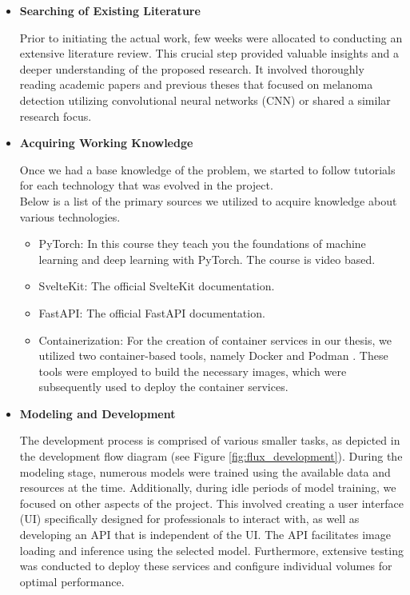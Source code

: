 \begin{itemize}
  \item{\textbf{Searching of Existing Literature}}

    Prior to initiating the actual work, few weeks were allocated
    to conducting an extensive literature review. This crucial step provided
    valuable insights and a deeper understanding of the proposed research. It
    involved thoroughly reading academic papers and previous theses that
    focused on melanoma detection utilizing convolutional neural networks (CNN)
    or shared a similar research focus.

  \item{\textbf{Acquiring Working Knowledge}}

    Once we had a base knowledge of the problem, we started to follow tutorials
    for each technology that was evolved in the project. \\

    Below is a list of the primary sources we utilized to acquire knowledge
    about various technologies.

    \begin{itemize}

      \item PyTorch: \cite{LearnPyTorch} In this course they teach you the
        foundations of machine learning and deep learning with PyTorch. The
        course is video based.

      \item SvelteKit: \cite{LearnSvelteKit} The official SvelteKit
        documentation.

      \item FastAPI: \cite{LearnFastAPI} The official FastAPI documentation.

      \item Containerization: For the creation of container services in our thesis, we
        utilized two container-based tools, namely Docker \cite{LearnDocker} and
        Podman \cite{LearnPodman}. These tools were employed to build the
        necessary images, which were subsequently used to deploy the container
        services.

    \end{itemize}

  \item{\textbf{Modeling and Development}}

    The development process is comprised of various smaller tasks, as depicted
    in the development flow diagram (see Figure \ref{fig:flux_development}).
    During the modeling stage, numerous models were trained using the available
    data and resources at the time. Additionally, during idle periods of model
    training, we focused on other aspects of the project. This involved
    creating a user interface (UI) specifically designed for professionals to
    interact with, as well as developing an API that is independent of the UI.
    The API facilitates image loading and inference using the selected model.
    Furthermore, extensive testing was conducted to deploy these services and
    configure individual volumes for optimal performance.


\end{itemize}
